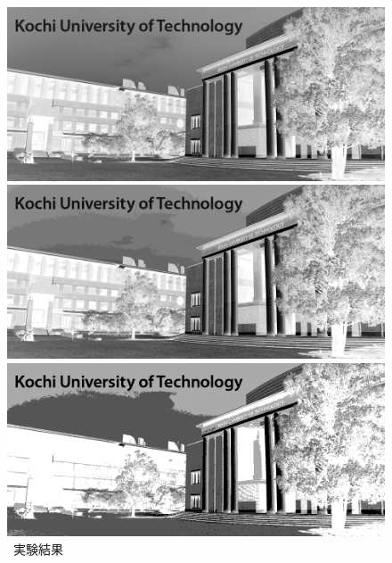 \begin{figure}[H]
\begin{minipage}[b]{.23\textwidth}
    \end{minipage}
    \caption{\kadaiab\ 実験結果}
    \vsp
    \begin{minipage}[b]{.23\textwidth}
        \centering
        \includegraphics[keepaspectratio,width=\textwidth]{../../Figures/05_31_8.png}
    \end{minipage}
    \begin{minipage}[b]{.23\textwidth}
        \centering
        \includegraphics[keepaspectratio,width=\textwidth]{../../Figures/05_32_4.png}
    \end{minipage}
    \begin{minipage}[b]{.23\textwidth}
        \centering
        \includegraphics[keepaspectratio,width=\textwidth]{../../Figures/05_33_2.png}

\end{minipage}
\end{figure}
